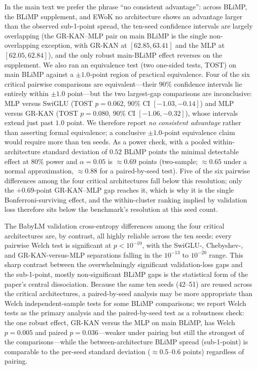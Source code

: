 \documentclass{article}
\newcommand{\modelname}[1]{\textsc{#1}}
\newcommand{\grkan}{\modelname{GR-KAN}}
\begin{document}
In the main text we prefer the phrase ``no consistent advantage'': across BLiMP, the BLiMP supplement, and EWoK no architecture shows an advantage larger than the observed sub-1-point spread, the ten-seed confidence intervals are largely overlapping (the \grkan{}--MLP pair on main BLiMP is the single non-overlapping exception, with \grkan{} at \([62.85,63.41]\) and the MLP at \([62.05,62.84]\)), and the only robust main-BLiMP effect reverses on the supplement. We also ran an equivalence test (two one-sided tests, TOST) on main BLiMP against a \(\pm1.0\)-point region of practical equivalence. Four of the six critical pairwise comparisons are equivalent---their \(90\%\) confidence intervals lie entirely within \(\pm1.0\) point---but the two largest-gap comparisons are inconclusive: MLP versus SwiGLU (TOST \(p=0.062\), \(90\%\) CI \([-1.03,-0.14]\)) and MLP versus \grkan{} (TOST \(p=0.080\), \(90\%\) CI \([-1.06,-0.32]\)), whose intervals extend just past \(1.0\) point. We therefore report \emph{no consistent advantage} rather than asserting formal equivalence; a conclusive \(\pm1.0\)-point equivalence claim would require more than ten seeds. As a power check, with a pooled within-architecture standard deviation of \(0.52\) BLiMP points the minimal detectable effect at \(80\%\) power and \(\alpha=0.05\) is \(\approx0.69\) points (two-sample; \(\approx0.65\) under a normal approximation, \(\approx0.88\) for a paired-by-seed test). Five of the six pairwise differences among the four critical architectures fall below this resolution; only the \(+0.69\)-point \grkan{}--MLP gap reaches it, which is why it is the single Bonferroni-surviving effect, and the within-cluster ranking implied by validation loss therefore sits below the benchmark's resolution at this seed count.

The BabyLM validation cross-entropy differences among the four critical architectures are, by contrast, all highly reliable across the ten seeds: every pairwise Welch test is significant at \(p<10^{-10}\), with the SwiGLU-, Chebyshev-, and \grkan{}-versus-MLP separations falling in the \(10^{-13}\) to \(10^{-20}\) range. This sharp contrast between the overwhelmingly significant validation-loss gaps and the sub-1-point, mostly non-significant BLiMP gaps is the statistical form of the paper's central dissociation. Because the same ten seeds (42--51) are reused across the critical architectures, a paired-by-seed analysis may be more appropriate than Welch independent-sample tests for some BLiMP comparisons; we report Welch tests as the primary analysis and the paired-by-seed test as a robustness check: the one robust effect, \grkan{} versus the MLP on main BLiMP, has Welch \(p=0.005\) and paired \(p=0.036\)---weaker under pairing but still the strongest of the comparisons---while the between-architecture BLiMP spread (sub-1-point) is comparable to the per-seed standard deviation (\(\approx\)0.5--0.6 points) regardless of pairing.
\end{document}
